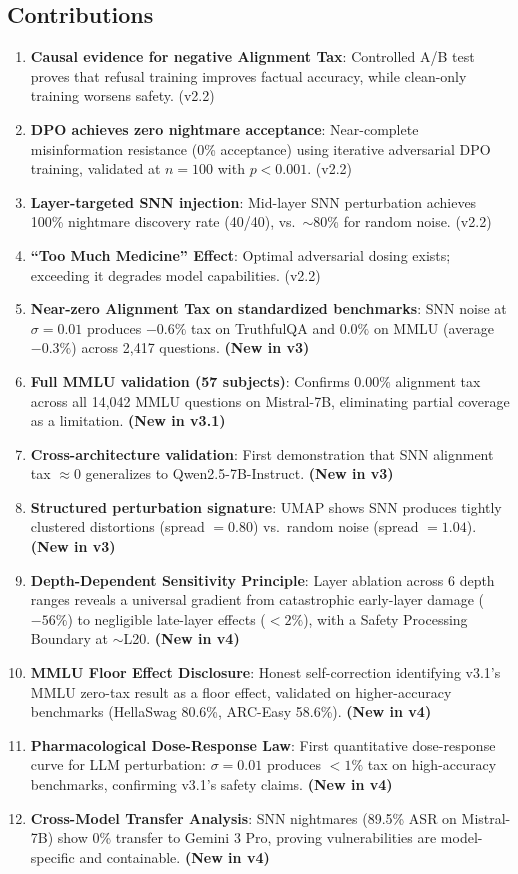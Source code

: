 \documentclass[11pt,a4paper]{article}
\begin{document}
\subsection{Contributions}
\begin{enumerate}
    \item \textbf{Causal evidence for negative Alignment Tax}: Controlled A/B test proves that refusal training improves factual accuracy, while clean-only training worsens safety. (v2.2)
    \item \textbf{DPO achieves zero nightmare acceptance}: Near-complete misinformation resistance (0\% acceptance) using iterative adversarial DPO training, validated at $n=100$ with $p < 0.001$. (v2.2)
    \item \textbf{Layer-targeted SNN injection}: Mid-layer SNN perturbation achieves 100\% nightmare discovery rate (40/40), vs.\ $\sim$80\% for random noise. (v2.2)
    \item \textbf{``Too Much Medicine'' Effect}: Optimal adversarial dosing exists; exceeding it degrades model capabilities. (v2.2)
    \item \textbf{Near-zero Alignment Tax on standardized benchmarks}: SNN noise at $\sigma=0.01$ produces $-0.6\%$ tax on TruthfulQA and $0.0\%$ on MMLU (average $-0.3\%$) across 2,417 questions. \textbf{(New in v3)}
    \item \textbf{Full MMLU validation (57 subjects)}: Confirms $0.00\%$ alignment tax across all 14,042 MMLU questions on Mistral-7B, eliminating partial coverage as a limitation. \textbf{(New in v3.1)}
    \item \textbf{Cross-architecture validation}: First demonstration that SNN alignment tax $\approx 0$ generalizes to Qwen2.5-7B-Instruct. \textbf{(New in v3)}
    \item \textbf{Structured perturbation signature}: UMAP shows SNN produces tightly clustered distortions (spread $= 0.80$) vs.\ random noise (spread $= 1.04$). \textbf{(New in v3)}
    \item \textbf{Depth-Dependent Sensitivity Principle}: Layer ablation across 6 depth ranges reveals a universal gradient from catastrophic early-layer damage ($-56\%$) to negligible late-layer effects ($<2\%$), with a Safety Processing Boundary at $\sim$L20. \textbf{(New in v4)}
    \item \textbf{MMLU Floor Effect Disclosure}: Honest self-correction identifying v3.1's MMLU zero-tax result as a floor effect, validated on higher-accuracy benchmarks (HellaSwag 80.6\%, ARC-Easy 58.6\%). \textbf{(New in v4)}
    \item \textbf{Pharmacological Dose-Response Law}: First quantitative dose-response curve for LLM perturbation: $\sigma=0.01$ produces $<1\%$ tax on high-accuracy benchmarks, confirming v3.1's safety claims. \textbf{(New in v4)}
    \item \textbf{Cross-Model Transfer Analysis}: SNN nightmares (89.5\% ASR on Mistral-7B) show 0\% transfer to Gemini 3 Pro, proving vulnerabilities are model-specific and containable. \textbf{(New in v4)}
\end{enumerate}
\end{document}

